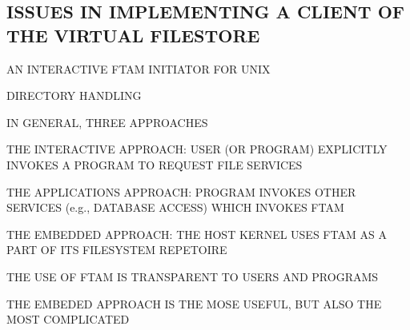 
\begin{bwslide}
\part	{ISSUES IN IMPLEMENTING A CLIENT OF THE VIRTUAL FILESTORE}

\begin{nrtc}\bf
\item	AN INTERACTIVE FTAM INITIATOR FOR UNIX

\item	DIRECTORY HANDLING
\end{nrtc}
\end{bwslide}


\begin{bwslide}

\begin{nrtc}
\item	IN GENERAL, THREE APPROACHES

\item	THE INTERACTIVE APPROACH: USER (OR PROGRAM) EXPLICITLY INVOKES
	A PROGRAM TO REQUEST FILE SERVICES

\item	THE APPLICATIONS APPROACH: PROGRAM INVOKES OTHER SERVICES
	(e.g., DATABASE ACCESS) WHICH INVOKES FTAM

\item	THE EMBEDDED APPROACH: THE HOST KERNEL USES FTAM AS A PART OF ITS
	FILESYSTEM REPETOIRE
    \begin{nrtc}
    \item	THE USE OF FTAM IS TRANSPARENT TO USERS AND PROGRAMS
    \end{nrtc}

\item	THE EMBEDED APPROACH IS THE MOSE USEFUL, BUT ALSO THE MOST COMPLICATED
\end{nrtc}
\end{bwslide}



